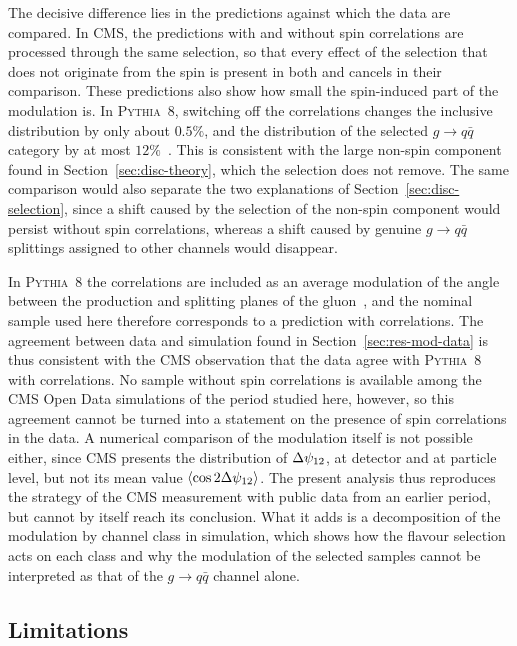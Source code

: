 The decisive difference lies in the predictions against which the data are
compared. In CMS, the predictions with and without spin correlations are processed
through the same selection, so that every effect of the selection that does not
originate from the spin is present in both and cancels in their comparison. These
predictions also show how small the spin-induced part of the modulation is. In
\textsc{Pythia}~8, switching off the correlations changes the inclusive
distribution by only about $0.5\%$, and the distribution of the selected
$g \to q\bar{q}$ category by at most $12\%$~\cite{CMS:2026jnt}. This is consistent
with the large non-spin component found in Section~\ref{sec:disc-theory}, which
the selection does not remove. The same comparison would also separate the two
explanations of Section~\ref{sec:disc-selection}, since a shift caused by the
selection of the non-spin component would persist without spin correlations,
whereas a shift caused by genuine $g \to q\bar{q}$ splittings assigned to other
channels would disappear.

In \textsc{Pythia}~8 the correlations are included as an average modulation of the
angle between the production and splitting planes of the
gluon~\cite{CMS:2026jnt}, and the nominal sample used here therefore corresponds
to a prediction with correlations. The agreement between data and simulation found
in Section~\ref{sec:res-mod-data} is thus consistent with the CMS observation that
the data agree with \textsc{Pythia}~8 with correlations. No sample without spin
correlations is available among the CMS Open Data simulations of the period
studied here, however, so this agreement cannot be turned into a statement on the
presence of spin correlations in the data. A numerical comparison of the
modulation itself is not possible either, since CMS presents the distribution of
$\Delta\psi_{12}$, at detector and at particle level, but not its mean value
$\langle \cos 2\Delta\psi_{12} \rangle$. The present analysis thus reproduces the strategy of
the CMS measurement with public data from an earlier period, but cannot by itself
reach its conclusion. What it adds is a decomposition of the modulation by channel
class in simulation, which shows how the flavour selection acts on each class and
why the modulation of the selected samples cannot be interpreted as that of the
$g \to q\bar{q}$ channel alone.

\subsection{Limitations}
\label{sec:disc-limits}

